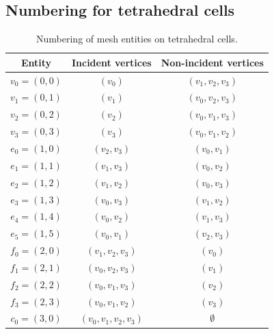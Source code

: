 \newpage

\subsection{Numbering for tetrahedral cells}

\begin{table}[H]
\linespread{1.1}\selectfont
  \begin{center}
    \begin{tabular}{|c|c|c|}
      \hline
      Entity & Incident vertices & Non-incident vertices \\
      \hline
      \hline
      $v_0 = (0, 0)$ & $(v_0)$ & $(v_1, v_2, v_3)$ \\
      \hline
      $v_1 = (0, 1)$ & $(v_1)$ & $(v_0, v_2, v_3)$ \\
      \hline
      $v_2 = (0, 2)$ & $(v_2)$ & $(v_0, v_1, v_3)$ \\
      \hline
      $v_3 = (0, 3)$ & $(v_3)$ & $(v_0, v_1, v_2)$ \\
      \hline
      $e_0 = (1, 0)$ & $(v_2, v_3)$ & $(v_0, v_1)$ \\
      \hline
      $e_1 = (1, 1)$ & $(v_1, v_3)$ & $(v_0, v_2)$ \\
      \hline
      $e_2 = (1, 2)$ & $(v_1, v_2)$ & $(v_0, v_3)$ \\
      \hline
      $e_3 = (1, 3)$ & $(v_0, v_3)$ & $(v_1, v_2)$ \\
      \hline
      $e_4 = (1, 4)$ & $(v_0, v_2)$ & $(v_1, v_3)$ \\
      \hline
      $e_5 = (1, 5)$ & $(v_0, v_1)$ & $(v_2, v_3)$ \\
      \hline
      $f_0 = (2, 0)$ & $(v_1, v_2, v_3)$ & $(v_0)$ \\
      \hline
      $f_1 = (2, 1)$ & $(v_0, v_2, v_3)$ & $(v_1)$ \\
      \hline
      $f_2 = (2, 2)$ & $(v_0, v_1, v_3)$ & $(v_2)$ \\
      \hline
      $f_3 = (2, 3)$ & $(v_0, v_1, v_2)$ & $(v_3)$ \\
      \hline
      $c_0 = (3, 0)$ & $(v_0, v_1, v_2, v_3)$ & $\emptyset$ \\
      \hline
    \end{tabular}
    \caption{Numbering of mesh entities on tetrahedral cells.}
        \label{tab:tetrahedron,entities} 
  \end{center}
\end{table}

\vfill

